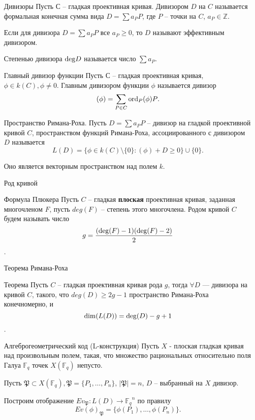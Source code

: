 \documentclass{beamer}
\begin{document}
\begin {frame} {Дивизоры}
Пусть $С$ -- гладкая проективная кривая. Дивизором $D$ на $C$ называется формальная конечная сумма вида $D = \sum{a_PP}$, где $P$ -- точки на $C$, $a_P \in {\mathbb Z}$.
\newline

Если для дивизора $D = \sum{a_PP}$ все $a_P \ge 0$, то $D$ называют эффективным дивизором.
\newline

 Степенью дивизора ${\rm deg}D$ называется число $\sum{a_P}$.
\end {frame}

\begin {frame} {Главный дивизор функции}
 Пусть $С$ -- гладкая проективная кривая, $\phi \in k(C), \phi \ne 0$. Главным дивизором функции $\phi$ называется дивизор $$(\phi) = \sum_{P \in C}{{\rm ord}_P(\phi)P}.$$
\end {frame}

\begin {frame} {Пространство Римана-Роха.}
Пусть $D = \sum{a_PP}$ -- дивизор на гладкой проективной кривой $C$, пространством функций Римана-Роха, ассоциированного с дивизором $D$ называется $$L(D) = \{\phi \in k(C) \setminus \{0\} : (\phi) + D \ge 0\} \cup \{0\}.$$

Оно является векторным пространством над полем $k$.
\newline
\end {frame}

\begin {frame} {Род кривой}
\begin {block} {Формула Плюкера}
 Пусть $C$ -- гладкая {\bf плоская} проективная кривая, заданная многочленом $F$, пусть $deg(F)$ -- степень этого многочлена. Родом кривой $C$ будем называть число $$g = \frac{({\rm deg}(F)-1)({\rm deg}(F)-2)}{2}$$.
\end {block}
\end {frame}

\begin {frame} {Теорема Римана-Роха}
\begin {block} {Теорема}
Пусть $C$  -- гладкая проективная кривая рода $g$, тогда $\forall D$ --- дивизора на кривой $C$, такого, что $deg(D) \ge 2g - 1$ пространство Римана-Роха конечномерно, и $${\rm dim}(L(D)) = {\rm deg}(D) - g + 1$$.
\end {block}
\end {frame}

\begin {frame} {Алгеброгеометрический код (L-конструкция)}
Пусть $X$ - плоская гладкая кривая над произвольным полем, такая, что множество рациональных относительно поля Галуа ${\mathbb F_q}$ точек $X({\mathbb F_q})$ непусто.

Пусть ${\mathfrak P} \subset  X({\mathbb F_q}), {\mathfrak P} = \{P_1, \dots, P_n\}$, $|{\mathfrak P}| = n$, $D$ -- выбранный на $X$ дивизор.
\newline

Построим отображение $Ev_{\mathfrak P} : L(D) \to {\mathbb F_q}^n$ по правилу $$Ev(\phi)_{\mathfrak P} = \{ \phi(P_1), \dots, \phi(P_n) \}.$$
\end {frame}
\end{document}
